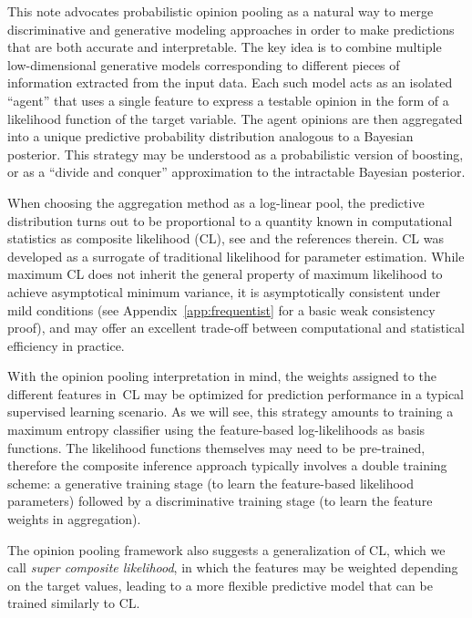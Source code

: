 \documentclass[english]{scrartcl}
\begin{document}
This note advocates probabilistic opinion pooling \cite{Genest-86} as a natural way to merge discriminative and generative modeling approaches in order to make predictions that are both accurate and interpretable. The key idea is to combine multiple low-dimensional generative models corresponding to different pieces of information extracted from the input data. Each such model acts as an isolated ``agent'' that uses a single feature to express a testable opinion in the form of a likelihood function of the target variable. The agent opinions are then aggregated into a unique predictive probability distribution analogous to a Bayesian posterior. This strategy may be understood as a probabilistic version of boosting, or as a ``divide and conquer'' approximation to the intractable Bayesian posterior. 


When choosing the aggregation method as a log-linear pool, the predictive distribution turns out to be proportional to a quantity known in computational statistics as composite likelihood (CL), see \cite{Varin-11} and the references therein. CL was developed as a surrogate of traditional likelihood for parameter estimation. While maximum CL does not inherit the general property of maximum likelihood to achieve asymptotical minimum variance, it is asymptotically consistent under mild conditions \cite{Xu-11} (see Appendix~\ref{app:frequentist} for a basic weak consistency proof), and may offer an excellent trade-off between computational and statistical efficiency in practice.

With the opinion pooling interpretation in mind, the weights assigned to the different features in~CL may be optimized for prediction performance in a typical supervised learning scenario. As we will see, this strategy amounts to training a maximum entropy classifier using the feature-based log-likelihoods as basis functions. The likelihood functions themselves may need to be pre-trained, therefore the composite inference approach typically involves a double training scheme: a generative training stage (to learn the feature-based likelihood parameters) followed by a discriminative training stage (to learn the feature weights in aggregation).

The opinion pooling framework also suggests a generalization of CL, which we call {\em super composite likelihood}, in which the features may be weighted depending on the target values, leading to a more flexible predictive model that can be trained similarly to CL.
\end{document}
